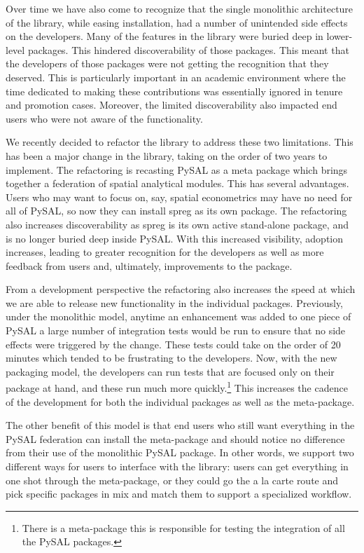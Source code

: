 \documentclass[11pt]{article}
\begin{document}
Over time we have also come to recognize that the single monolithic
architecture of the library, while easing installation, had a number of
unintended side effects on the developers. Many of the features in the library
were buried deep in lower-level packages. This hindered discoverability of
those packages. This meant that the developers of those packages were not
getting the recognition that they deserved. This is particularly important in an
academic environment where the time dedicated to making these contributions was
essentially ignored in tenure and promotion cases. Moreover, the limited
discoverability also impacted end users who were not aware of the
functionality.


We recently decided to refactor the library to address these two limitations.
This has been a major change in the library, taking on the order of two years
to implement. The refactoring is recasting PySAL as a meta package which brings
together a federation of spatial analytical modules. This has several
advantages. Users who may want to focus on, say, spatial econometrics
may have no need for all of PySAL, so now they can install spreg as its own
package. The refactoring also increases discoverability as spreg is its own
active stand-alone package, and is no longer buried deep inside PySAL. With
this increased visibility, adoption increases, leading to greater recognition
for the developers as well as more feedback from users and, ultimately,
improvements to the package.

From a development perspective the refactoring also increases the speed at
which we are able to release new functionality in the individual packages.
Previously, under the monolithic model, anytime an enhancement was
added to one piece of PySAL a large number of integration tests would be run to
ensure that no side effects were triggered by the change. These tests could
take on the order of 20 minutes which tended to be frustrating
to the developers. Now, with the new packaging model, the developers can run
 tests that are focused only on their package at hand, and these run much more
quickly.\footnote{There is a meta-package this is responsible for testing the
integration of all the PySAL packages.} This increases the cadence of the development for both
the individual packages as well as the meta-package.


The other benefit of this model is that end users who still want everything in
the PySAL federation can install the meta-package and should notice no
difference from their use of the monolithic PySAL package. In other words, we
support two different ways for users to interface with the library: users can
get everything in one shot through the meta-package, or they could go the a la
carte route and pick specific packages in mix and match them to support a
specialized workflow.
\end{document}
